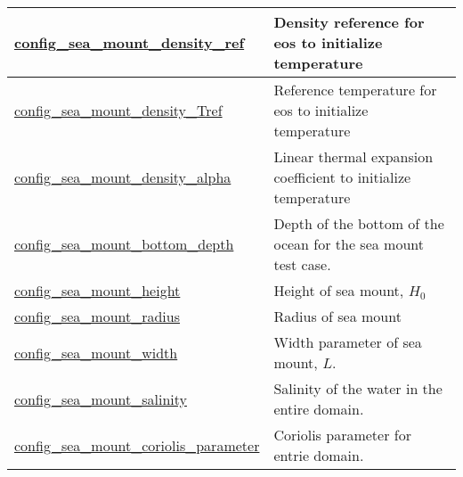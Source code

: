 {\begin{center}
\begin{longtable}{| p{2.0in} || p{4.0in} |}
    \hline
    \hyperref[subsec:nm_sec_config_sea_mount_density_ref]{config\_sea\_mount\_density\_ref} & Density reference for eos to initialize temperature \\
    \hline
    \hyperref[subsec:nm_sec_config_sea_mount_density_Tref]{config\_sea\_mount\_density\_Tref} & Reference temperature for eos to initialize temperature \\
    \hline
    \hyperref[subsec:nm_sec_config_sea_mount_density_alpha]{config\_sea\_mount\_density\_\-alpha} & Linear thermal expansion coefficient to initialize temperature \\
    \hline
    \hyperref[subsec:nm_sec_config_sea_mount_bottom_depth]{config\_sea\_mount\_bottom\_\-depth} & Depth of the bottom of the ocean for the sea mount test case. \\
    \hline
    \hyperref[subsec:nm_sec_config_sea_mount_height]{config\_sea\_mount\_height} & Height of sea mount, $H_0$ \\
    \hline
    \hyperref[subsec:nm_sec_config_sea_mount_radius]{config\_sea\_mount\_radius} & Radius of sea mount \\
    \hline
    \hyperref[subsec:nm_sec_config_sea_mount_width]{config\_sea\_mount\_width} & Width parameter of sea mount, $L$. \\
    \hline
    \hyperref[subsec:nm_sec_config_sea_mount_salinity]{config\_sea\_mount\_salinity} & Salinity of the water in the entire domain. \\
    \hline
    \hyperref[subsec:nm_sec_config_sea_mount_coriolis_parameter]{config\_sea\_mount\_coriolis\_\-parameter} & Coriolis parameter for entrie domain. \\
    \hline
\end{longtable}
\end{center}
}
